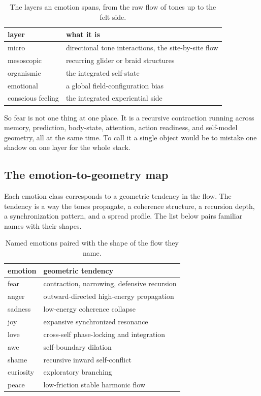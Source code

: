 \begin{table}[ht]
\centering
\begin{tabular}{@{}ll@{}}
\toprule
layer & what it is \\
\midrule
micro & directional tone interactions, the site-by-site flow \\
mesoscopic & recurring glider or braid structures \\
organismic & the integrated self-state \\
emotional & a global field-configuration bias \\
conscious feeling & the integrated experiential side \\
\bottomrule
\end{tabular}
\caption{The layers an emotion spans, from the raw flow of tones up to the felt side.}
\label{tab:emotion-stack}
\end{table}

So fear is not one thing at one place. It is a recursive contraction running across memory, prediction, body-state, attention, action readiness, and self-model geometry, all at the same time. To call it a single object would be to mistake one shadow on one layer for the whole stack.

\subsection{The emotion-to-geometry map}

Each emotion class corresponds to a geometric tendency in the flow. The tendency is a way the tones propagate, a coherence structure, a recursion depth, a synchronization pattern, and a spread profile. The list below pairs familiar names with their shapes.

\begin{table}[ht]
\centering
\begin{tabular}{@{}ll@{}}
\toprule
emotion & geometric tendency \\
\midrule
fear & contraction, narrowing, defensive recursion \\
anger & outward-directed high-energy propagation \\
sadness & low-energy coherence collapse \\
joy & expansive synchronized resonance \\
love & cross-self phase-locking and integration \\
awe & self-boundary dilation \\
shame & recursive inward self-conflict \\
curiosity & exploratory branching \\
peace & low-friction stable harmonic flow \\
\bottomrule
\end{tabular}
\caption{Named emotions paired with the shape of the flow they name.}
\label{tab:emotion-map}
\end{table}

